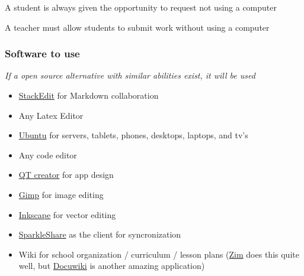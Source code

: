 \documentclass[CSHFoundation.tex]{subfiles}
\begin{document}
A student is always given the opportunity to request not using a computer

A teacher must allow students to submit work without using a computer



\subsubsection{Software to use}



\emph{If a open source alternative with similar abilities exist, it will be used}



\begin{itemize}
\item \href{https://stackedit.io/}{StackEdit} for Markdown collaboration
\item Any Latex Editor
\item \href{http://www.ubuntu.com/}{Ubuntu} for servers, tablets, phones, desktops, laptops, and tv's
\item Any code editor
\item \href{http://qt-project.org/}{QT creator} for app design
\item \href{http://www.gimp.org/}{Gimp} for image editing
\item \href{http://www.inkscape.org/en/}{Inkscape} for vector editing
\item \href{./SparkleShare.tex}{SparkleShare} as the client for syncronization
\item Wiki for school organization / curriculum / lesson plans (\href{http://zim-wiki.org/manual/Help/Templates.html}{Zim} does this quite well, but \href{https://www.dokuwiki.org/dokuwiki}{Docuwiki} is another amazing application)
\end{itemize}
\end{document}
